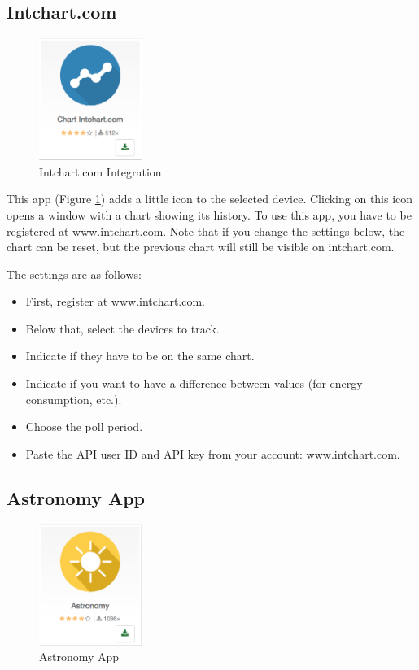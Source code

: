 \subsection{Intchart.com}


\begin{figure}
\begin{center}
\includegraphics[width=0.3\textwidth]{pngs/cap6/app41.png}
\caption{Intchart.com Integration}
\label{app41}
\end{center}
\end{figure}

This app (Figure \ref{app41}) adds a little icon to the selected device. Clicking on this 
icon opens a window with a chart showing its history. To use this app, you have to be 
registered at www.intchart.com. Note that if you change the settings below, the chart can 
be reset, but the previous chart will still be visible on intchart.com.

The settings are as follows:

\begin{itemize}
\item First, register at www.intchart.com.
\item Below that, select the devices to track.
\item Indicate if they have to be on the same chart.
\item Indicate if you want to have a difference between values (for energy consumption, etc.).
\item Choose the poll period.
\item Paste the API user ID and API key from your account: www.intchart.com.
\end{itemize}


\subsection{Astronomy App}


\begin{figure}
\begin{center}
\includegraphics[width=0.3\textwidth]{pngs/cap6/app42.png}
\caption{Astronomy App}
\label{app42}
\end{center}
\end{figure}

